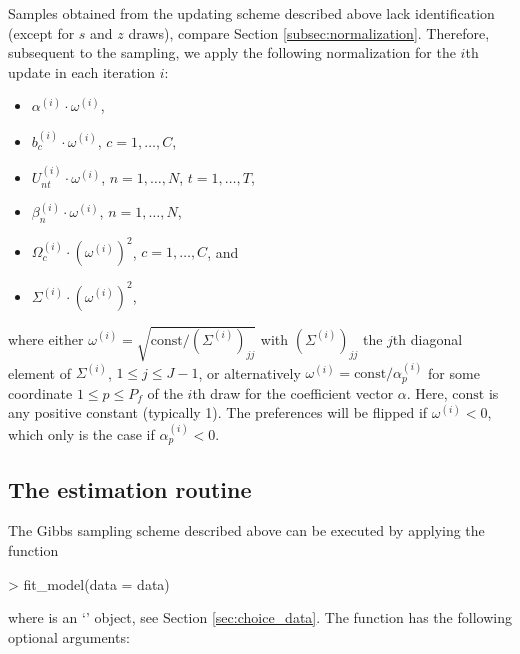 \documentclass[article]{jss}
\newcommand{\class}[1]{`\code{#1}'}
\begin{document}
Samples obtained from the updating scheme described above lack identification (except for $s$ and $z$ draws), compare Section \ref{subsec:normalization}. Therefore, subsequent to the sampling, we apply the following normalization for the $i$th update in each iteration $i$:
\begin{itemize}
  \item $\alpha^{(i)} \cdot \omega^{(i)}$,
  \item $b_c^{(i)} \cdot \omega^{(i)}$, $c=1,\dots,C$,
  \item $U_{nt}^{(i)} \cdot \omega^{(i)}$, $n = 1,\dots,N$, $t = 1,\dots,T$,
  \item $\beta_n^{(i)} \cdot \omega^{(i)}$, $n = 1,\dots,N$,
  \item $\Omega_c^{(i)} \cdot (\omega^{(i)})^2$, $c=1,\dots,C$, and
  \item $\Sigma^{(i)} \cdot (\omega^{(i)})^2$,
\end{itemize}
where either $\omega^{(i)} = \sqrt{\text{const} / (\Sigma^{(i)})_{jj}}$ with $(\Sigma^{(i)})_{jj}$ the $j$th diagonal element of $\Sigma^{(i)}$, $1\leq j \leq J-1$, or alternatively $\omega^{(i)} = \text{const} / \alpha^{(i)}_p$ for some coordinate $1\leq p \leq P_f$ of the $i$th draw for the coefficient vector $\alpha$. Here, $\text{const}$ is any positive constant (typically 1). The preferences will be flipped if $\omega^{(i)} < 0$, which only is the case if $\alpha^{(i)}_p < 0$.

\subsection{The estimation routine} \label{subsec:estimation_routine}

The Gibbs sampling scheme described above can be executed by applying the function

\begin{Schunk}
\begin{Sinput}
> fit_model(data = data)
\end{Sinput}
\end{Schunk}

where  is an \class{RprobitB\_data} object, see Section \ref{sec:choice_data}. The function has the following optional arguments:
\end{document}
